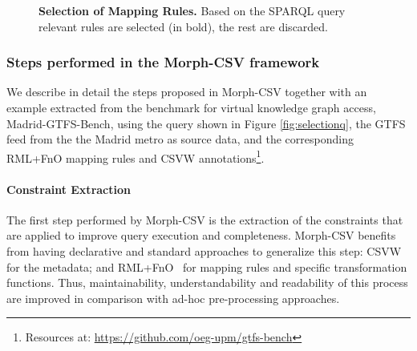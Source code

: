 \begin{figure}[ht]
  \centering
\caption[Selection of mapping rules]{\textbf{Selection of Mapping Rules.} Based on the SPARQL query relevant rules are selected (in bold), the rest are discarded.}
\label{fig:selection}
\end{figure}

\subsubsection{Steps performed in the Morph-CSV framework}
We describe in detail the steps proposed in Morph-CSV together with an example extracted from the benchmark for virtual knowledge graph access, Madrid-GTFS-Bench, using the query shown in Figure \ref{fig:selectionq}, the GTFS feed from the the Madrid metro as source data, and the corresponding RML+FnO mapping rules and CSVW annotations\footnote{Resources at: \url{https://github.com/oeg-upm/gtfs-bench}}.

\paragraph{Constraint Extraction}
The first step performed by Morph-CSV is the extraction of the constraints that are applied to improve query execution and completeness. Morph-CSV benefits from having declarative and standard approaches to generalize this step: CSVW~\citep{tennison2015model} for the metadata; and RML+FnO~\citep{de2017declarative} for mapping rules and specific transformation functions. Thus, maintainability, understandability and readability of this process are improved in comparison with ad-hoc pre-processing approaches. 

